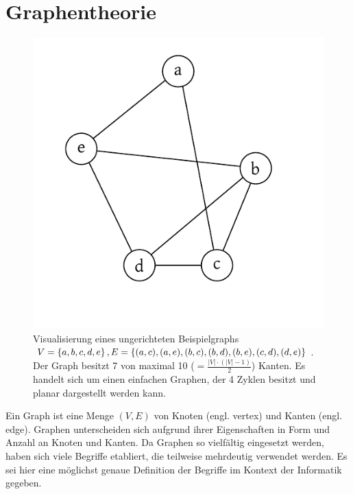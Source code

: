 \chapter{Graphentheorie}
%
\begin{figure}[p]
 \begin{center}
  \includegraphics{img/example_graph.pdf}
  \caption{
      Visualisierung eines ungerichteten Beispielgraphs $V = \left\{a, b, c, d, e\right\},
      E = \left\{(a, c), (a, e), (b, c), (b, d), (b, e), (c, d), (d, e)\right\}$.
      Der Graph besitzt 7 von maximal 10 ($= \frac{|V| \cdot (|V|-1)}{2}$)
      Kanten. Es handelt sich um einen einfachen Graphen, der 4 Zyklen besitzt
      und planar dargestellt werden kann.
  }
  \label{fig:example_graph}
 \end{center}
\end{figure}

Ein Graph ist eine Menge $(V, E)$ von Knoten (engl. vertex) und Kanten (engl. edge). Graphen unterscheiden sich aufgrund ihrer Eigenschaften in Form und Anzahl an Knoten und Kanten. Da Graphen so vielfältig eingesetzt werden, haben sich viele Begriffe etabliert, die teilweise mehrdeutig verwendet werden. Es sei hier eine möglichst genaue Definition der Begriffe im Kontext der Informatik gegeben.

